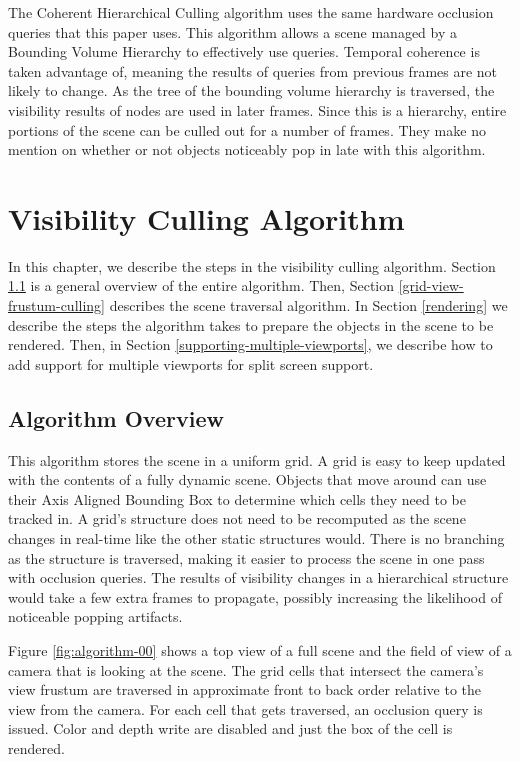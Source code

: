 \documentclass[12pt]{ucthesis}
\begin{document}
The Coherent Hierarchical Culling algorithm uses the same hardware occlusion queries that this paper uses.\cite{CHC, CHCpp}
This algorithm allows a scene managed by a Bounding Volume Hierarchy to effectively use queries.
Temporal coherence is taken advantage of, meaning the results of queries from previous frames are not likely to change.
As the tree of the bounding volume hierarchy is traversed, the visibility results of nodes are used in later frames.
Since this is a hierarchy, entire portions of the scene can be culled out for a number of frames.
They make no mention on whether or not objects noticeably pop in late with this algorithm.

\chapter{Visibility Culling Algorithm}
\label{visibility-culling-algorithm}

In this chapter, we describe the steps in the visibility culling algorithm.
Section \ref{algorithm-overview} is a general overview of the entire algorithm.
Then, Section \ref{grid-view-frustum-culling} describes the scene traversal algorithm.
In Section \ref{rendering} we describe the steps the algorithm takes to prepare the objects in the scene to be rendered.
Then, in Section \ref{supporting-multiple-viewports}, we describe how to add support for multiple viewports for split screen support. 

\section{Algorithm Overview}
\label{algorithm-overview}

This algorithm stores the scene in a uniform grid.
A grid is easy to keep updated with the contents of a fully dynamic scene.
Objects that move around can use their Axis Aligned Bounding Box to determine which cells they need to be tracked in.
A grid's structure does not need to be recomputed as the scene changes in real-time like the other static structures would.
There is no branching as the structure is traversed, making it easier to process the scene in one pass with occlusion queries.
The results of visibility changes in a hierarchical structure would take a few extra frames to propagate, possibly increasing the likelihood of noticeable popping artifacts.

Figure \ref{fig:algorithm-00} shows a top view of a full scene and the field of view of a camera that is looking at the scene.
The grid cells that intersect the camera's view frustum are traversed in approximate front to back order relative to the view from the camera.
For each cell that gets traversed, an occlusion query is issued.
Color and depth write are disabled and just the box of the cell is rendered.
\end{document}
